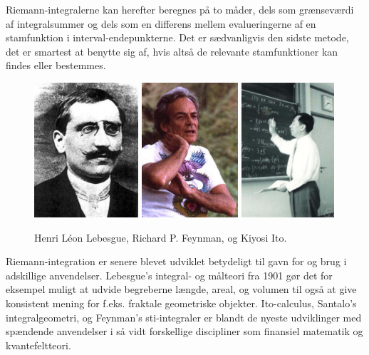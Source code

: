 \begin{think}
Riemann-integralerne kan herefter beregnes på to måder, dels som grænseværdi af integralsummer
og dels som en differens mellem evalueringerne af en stam\-funk\-tion i interval-endepunkterne.
Det er sædvanligvis den sidste metode, det er smartest at benytte sig af, hvis altså
de relevante stamfunktioner kan findes eller bestemmes.
\end{think}


\begin{figure}[h]
\centerline{\includegraphics[height=50mm]{FIGS/PERSLebesgue} \qquad  \includegraphics[height=50mm]{FIGS/PERSFeynman_8}
\qquad \includegraphics[height=50mm]{FIGS/PERSIto}}
\begin{center}
\caption{\small{Henri L\'{e}on Lebesgue, Richard P. Feynman,
og Kiyosi Ito.}} \label{figLebesgueItoFeynman}
\end{center}
\end{figure}

\begin{info}
Riemann-integration er senere blevet udviklet betydeligt til gavn for og brug i adskillige anvendelser. Lebesgue's integral- og målteori fra 1901 gør det for eksempel muligt at udvide begreberne længde, areal, og volumen til også at give konsistent mening for f.eks. fraktale geometriske objekter. Ito-calculus, Santalo's integralgeometri, og Feynman's sti-integraler er blandt de nyeste udviklinger med spændende anvendelser i så vidt forskellige discipliner som finansiel matematik og kvantefeltteori.
\end{info}


